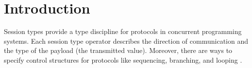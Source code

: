 \documentclass[acmsmall,screen]{acmart}
\begin{document}




\maketitle

\section{Introduction}
\label{sec:introduction}



Session types provide a type discipline for protocols
in concurrent programming systems. Each session type operator
describes the direction of communication and the type of the
payload (the transmitted value). Moreover, there are ways to specify
control structures for protocols like sequencing, branching, and
looping \cite{DBLP:conf/concur/Honda93,DBLP:conf/parle/TakeuchiHK94,DBLP:conf/esop/HondaVK98}.
\end{document}
